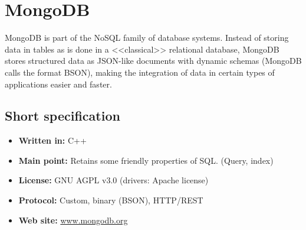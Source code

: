 \chapter{MongoDB}

MongoDB is part of the NoSQL family of database systems. Instead of storing data in tables as is done in a <<classical>> relational database, MongoDB stores structured data as JSON-like documents with dynamic schemas (MongoDB calls the format BSON), making the integration of data in certain types of applications easier and faster.

\section{Short specification}

\begin{itemize}
  \item \textbf{Written in:} C++
  \item \textbf{Main point:} Retains some friendly properties of SQL. (Query, index)
  \item \textbf{License:} GNU AGPL v3.0 (drivers: Apache license)
  \item \textbf{Protocol:} Custom, binary (BSON), HTTP/REST
  \item \textbf{Web site:} \href{http://www.mongodb.org/}{www.mongodb.org}
\end{itemize}